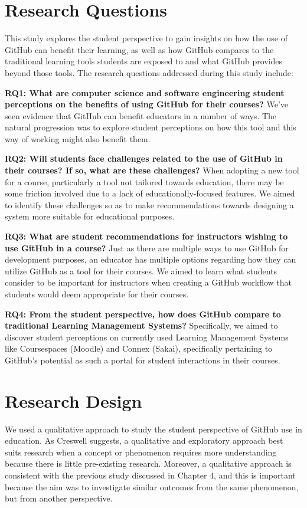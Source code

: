 \section{Research Questions}
This study explores the student perspective to gain insights on how the use of GitHub can benefit their learning, as well as how GitHub compares to the traditional learning tools students are exposed to and what GitHub provides beyond those tools. The research questions addressed during this study include:

\bigskip
\textbf{RQ1: What are computer science and software engineering student perceptions on the benefits of using GitHub for their courses?} We've seen evidence that GitHub can benefit educators in a number of ways. The natural progression was to explore student perceptions on how this tool and this way of working might also benefit them.

\bigskip
\textbf{RQ2: Will students face challenges related to the use of GitHub in their courses? If so, what are these challenges?} When adopting a new tool for a course, particularly a tool not tailored towards education, there may be some friction involved due to a lack of educationally-focused features. We aimed to identify these challenges so as to make recommendations towards designing a system more suitable for educational purposes.

\bigskip
\textbf{RQ3: What are student recommendations for instructors wishing to use GitHub in a course?} Just as there are multiple ways to use GitHub for development purposes, an educator has multiple options regarding how they can utilize GitHub as a tool for their courses. We aimed to learn what students consider to be important for instructors when creating a GitHub workflow that students would deem appropriate for their courses.

\bigskip
\textbf{RQ4: From the student perspective, how does GitHub compare to traditional Learning Management Systems?} Specifically, we aimed to discover student perceptions on currently used Learning Management Systems like Coursespaces (Moodle) and Connex (Sakai), specifically pertaining to GitHub's potential as such a portal for student interactions in their courses.

\section{Research Design}
We used a qualitative approach to study the student perspective of GitHub use in education. As Creswell \cite{creswell2013research} suggests, a qualitative and exploratory approach best suits research when a concept or phenomenon requires more understanding because there is little pre-existing research. Moreover, a qualitative approach is consistent with the previous study discussed in Chapter 4, and this is important because the aim was to investigate similar outcomes from the same phenomenon, but from another perspective. %


